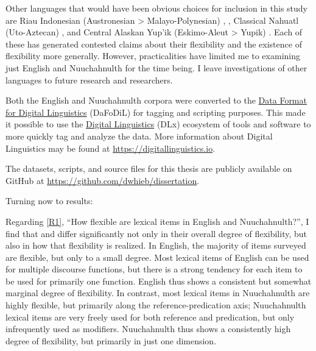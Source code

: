 Other languages that would have been obvious choices for inclusion in this study are Riau Indonesian (Austronesian > Malayo-Polynesian) \parencite{Gil1994},  \parencites{EvansOsada2005}{HengeveldRijkhoff2005}, Classical Nahuatl (Uto-Aztecan) \parencites{Launey1994}{Launey2004}, and Central Alaskan Yup'ik (Eskimo-Aleut > Yupik) \parencites{Thalbitzer1922}{Sadock1999}{Mithun2017}. Each of these has generated contested claims about their flexibility and the existence of flexibility more generally. However, practicalities have limited me to examining just English and Nuuchahnulth for the time being. I leave investigations of other languages to future research and researchers.

Both the English and Nuuchahnulth corpora were converted to the \href{https://format.digitallinguistics.io}{Data Format for Digital Linguistics} (DaFoDiL)  for tagging and scripting purposes. This made it possible to use the \href{https://digitallinguistics.io}{Digital Linguistics} (DLx) ecosystem of tools and software to more quickly tag and analyze the data. More information about Digital Linguistics may be found at \url{https://digitallinguistics.io}.

The datasets, scripts, and source files for this thesis are publicly available on GitHub at \url{https://github.com/dwhieb/dissertation}.

Turning now to results:

Regarding \ref{R1}, \enquote{How flexible are lexical items in English and Nuuchahnulth?}, I find that  and  differ significantly not only in their overall degree of flexibility, but also in how that flexibility is realized. In English, the majority of items surveyed are flexible, but only to a small degree. Most lexical items of English can be used for multiple discourse functions, but there is a strong tendency for each item to be used for primarily one function. English thus shows a consistent but somewhat marginal degree of flexibility. In contrast, most lexical items in Nuuchahnulth are highly flexible, but primarily along the reference-predication axis; Nuuchahnulth lexical items are very freely used for both reference and predication, but only infrequently used as modifiers. Nuuchahnulth thus shows a consistently high degree of flexibility, but primarily in just one dimension.


